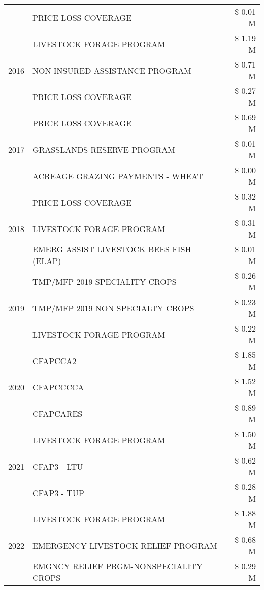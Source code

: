 \begin{tabular}{llr}
 & PRICE LOSS COVERAGE & \$ 0.01 M \\
\cline{1-3}
\multirow[t]{3}{*}{2016} & LIVESTOCK FORAGE PROGRAM & \$ 1.19 M \\
 & NON-INSURED ASSISTANCE PROGRAM & \$ 0.71 M \\
 & PRICE LOSS COVERAGE & \$ 0.27 M \\
\cline{1-3}
\multirow[t]{3}{*}{2017} & PRICE LOSS COVERAGE & \$ 0.69 M \\
 & GRASSLANDS RESERVE PROGRAM & \$ 0.01 M \\
 & ACREAGE GRAZING PAYMENTS - WHEAT & \$ 0.00 M \\
\cline{1-3}
\multirow[t]{3}{*}{2018} & PRICE LOSS COVERAGE & \$ 0.32 M \\
 & LIVESTOCK FORAGE PROGRAM & \$ 0.31 M \\
 & EMERG ASSIST LIVESTOCK BEES FISH (ELAP) & \$ 0.01 M \\
\cline{1-3}
\multirow[t]{3}{*}{2019} & TMP/MFP 2019 SPECIALITY CROPS & \$ 0.26 M \\
 & TMP/MFP 2019 NON SPECIALTY CROPS & \$ 0.23 M \\
 & LIVESTOCK FORAGE PROGRAM & \$ 0.22 M \\
\cline{1-3}
\multirow[t]{3}{*}{2020} & CFAPCCA2 & \$ 1.85 M \\
 & CFAPCCCCA & \$ 1.52 M \\
 & CFAPCARES & \$ 0.89 M \\
\cline{1-3}
\multirow[t]{3}{*}{2021} & LIVESTOCK FORAGE PROGRAM & \$ 1.50 M \\
 & CFAP3 - LTU & \$ 0.62 M \\
 & CFAP3 - TUP & \$ 0.28 M \\
\cline{1-3}
\multirow[t]{3}{*}{2022} & LIVESTOCK FORAGE PROGRAM & \$ 1.88 M \\
 & EMERGENCY LIVESTOCK RELIEF PROGRAM & \$ 0.68 M \\
 & EMGNCY RELIEF PRGM-NONSPECIALITY CROPS & \$ 0.29 M \\
\cline{1-3}
\bottomrule
\end{tabular}
